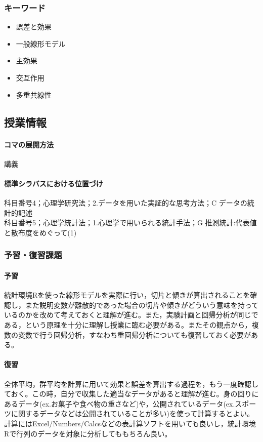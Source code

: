 \subsubsection{キーワード}
\begin{itemize}
\item 誤差と効果
\item 一般線形モデル
\item 主効果
\item 交互作用
\item 多重共線性
\end{itemize}
\subsection{授業情報}
\paragraph{コマの展開方法}
講義
\paragraph{標準シラバスにおける位置づけ}
科目番号4；心理学研究法；2.データを用いた実証的な思考方法；C データの統計的記述\\
科目番号5；心理学統計法；1.心理学で用いられる統計手法；G 推測統計:代表値と散布度をめぐって(1)
\subsubsection{予習・復習課題}
\paragraph{予習}
統計環境Rを使った線形モデルを実際に行い，切片と傾きが算出されることを確認し，また説明変数が離散的であった場合の切片や傾きがどういう意味を持っているのかを改めて考えておくと理解が進む。また，実験計画と回帰分析が同じである，という原理を十分に理解し授業に臨む必要がある。またその観点から，複数の変数で行う回帰分析，すなわち重回帰分析についても復習しておく必要がある。
\paragraph{復習}
全体平均，群平均を計算に用いて効果と誤差を算出する過程を，もう一度確認しておく。この時，自分で収集した適当なデータがあると理解が進む。身の回りにあるデータ(ex.お菓子や食べ物の重さなど)や，公開されているデータ(ex.スポーツに関するデータなどは公開されていることが多い)を使って計算するとよい。計算にはExcel/Numbers/Calcsなどの表計算ソフトを用いても良いし，統計環境Rで行列のデータを対象に分析してももちろん良い。


